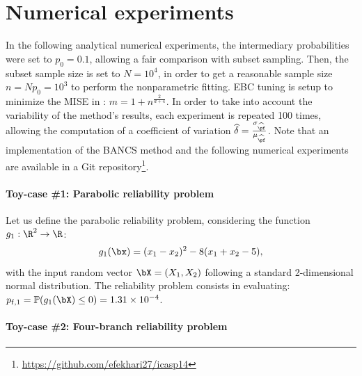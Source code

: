 \section{Numerical experiments}
In the following analytical numerical experiments, the intermediary probabilities were set to $p_0=0.1$, allowing a fair comparison with subset sampling. 
Then, the subset sample size is set to $N=10^4$, in order to get a reasonable sample size $n = N p_0 = 10^3$ to perform the nonparametric fitting. 
EBC tuning is setup to minimize the MISE in : $m = 1 + n^{\frac{2}{d+4}}$. 
In order to take into account the variability of the method's results, each experiment is repeated 100 times, allowing the computation of a coefficient of variation $\widehat{\delta} = \frac{\sigma_{\widehat{\pf}}}{\mu_{\widehat{\pf}}}$. 
Note that an implementation of the BANCS method and the following numerical experiments are available in a Git repository\footnote{\url{https://github.com/efekhari27/icasp14}}. 

\paragraph{Toy-case \#1: Parabolic reliability problem}

Let us define the parabolic reliability problem, considering the function $g_1: \R^2 \rightarrow \R$:
\begin{equation}
    g_1(\bx)= (x_1 - x_2) ^ 2 - 8 (x_1 + x_2 - 5),
\end{equation}
with the input random vector $\bX = (X_1, X_2)$ following a standard 2-dimensional normal distribution. 
The reliability problem consists in evaluating: $p_{\mathrm{f}, 1} = \mathbb{P} ( g_1(\bX) \leq 0 ) = 1.31 \times 10^{-4}$.

\paragraph{Toy-case \#2: Four-branch reliability problem}

